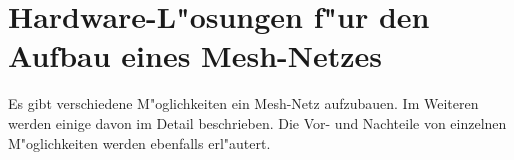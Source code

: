\section{Hardware-L"osungen f"ur den Aufbau eines Mesh-Netzes}

Es gibt verschiedene M"oglichkeiten ein Mesh-Netz aufzubauen.
Im Weiteren werden einige davon im Detail beschrieben. 
Die Vor- und Nachteile von einzelnen M"oglichkeiten werden ebenfalls erl"autert.




